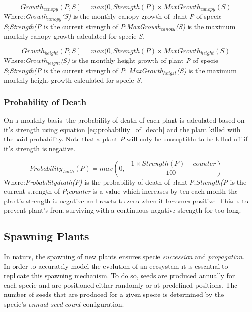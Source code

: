 \begin{equation}
Growth_{canopy}(\textit{P},S) = max(0, Strength(\textit{P}) \times  MaxGrowth_{canopy}(S)
\label{eq:actual_canopy_growth}
\end{equation}
Where:\textit{Growth$_{canopy}$(S)} is the monthly canopy growth of plant \textit{P} of specie \textit{S};\textit{Strength(\textit{P}} is the current strength of \textit{P};\textit{MaxGrowth$_{canopy}$(S)} is the maximum monthly canopy growth calculated for specie \textit{S}.

\begin{equation}
Growth_{height}(\textit{P},S) = max(0, Strength(\textit{P}) \times  MaxGrowth_{height}(S)
\label{eq:actual_height_growth}
\end{equation}
Where:\textit{Growth$_{height}$(S)} is the monthly height growth of plant \textit{P} of specie \textit{S};\textit{Strength(\textit{P}} is the current strength of \textit{P}; \textit{MaxGrowth$_{height}$(S)} is the maximum monthly height growth calculated for specie \textit{S}.

\subsubsection{Probability of Death}

On a monthly basis, the probability of death of each plant is calculated based on it's strength using equation \ref{eq:probability_of_death} and the plant killed with the said probability. Note that a plant \textit{P} will only be susceptible to be killed off if it's strength is negative. 

\begin{equation}
Probability_{death}(P) = max(0, \frac{-1 \times Strength(P) + counter}{100})
\label{eq:probability_of_death}
\end{equation}
Where:\textit{Probability{death}(P)} is the probability of death of plant \textit{P};\textit{Strength(\textit{P}} is the current strength of \textit{P};\textit{counter} is a value which increases by ten each month the plant's strength is negative and resets to zero when it becomes positive. This is to prevent plant's from surviving with a continuous negative strength for too long.

\subsection{Spawning Plants}

In nature, the spawning of new plants ensures specie \textit{succession} and \textit{propagation}. In order to accurately model the evolution of an ecosystem it is essential to replicate this spawning mechanism. To do so, seeds are produced annually for each specie and are positioned either randomly or at predefined positions. The number of seeds that are produced for a given specie is determined by the specie's \textit{annual seed count} configuration.\\

